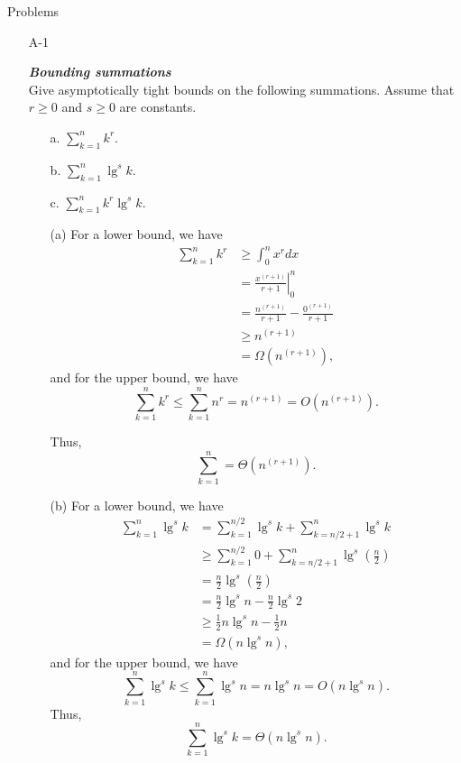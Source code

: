\documentclass{report}
\makeatletter
\renewenvironment{framed}{%
 \def\FrameCommand##1{\hskip\@totalleftmargin
 \fboxsep=\FrameSep\fbox{##1}}%
 \MakeFramed {\advance\hsize-\width
   \@totalleftmargin\z@ \linewidth\hsize
   \@setminipage}}%
 {\par\unskip\endMakeFramed}
\newcommand*\Eval[3]{\left.#1\right\rvert_{#2}^{#3}}
\makeatother
\begin{document}
\newpage

{\large Problems}

\begin{enumerate}

\item[A{-}1]{\textbf{\emph{Bounding summations}}\\
Give asymptotically tight bounds on the following summations. Assume that
$r \ge 0$ and $s \ge 0$ are constants.
\begin{enumerate}
  \item[a.] $\sum_{k = 1}^{n} k^r$.
  \item[b.] $\sum_{k = 1}^{n} \lg^s k$.
  \item[c.] $\sum_{k = 1}^{n} k^r \lg^s k$.
\end{enumerate}
}

\begin{framed}
\begin{enumerate}
\item[(a)] For a lower bound, we have
\begin{equation*}
\begin{aligned}
  \sum_{k = 1}^{n} k^r &\ge \int_{0}^{n} x^r dx\\
                       &=   \Eval{\frac{x^{(r + 1)}}{r + 1}}{0}{n}\\
                       &=   \frac{n^{(r + 1)}}{r + 1} - \frac{0^{(r + 1)}}{r + 1}\\
                       &\ge n^{(r + 1)}\\
                       &=   \Omega(n^{(r + 1)}),
\end{aligned}
\end{equation*}
and for the upper bound, we have
\[
  \sum_{k = 1}^{n} k^r \le \sum_{k = 1}^{n} n^r = n^{(r + 1)} = O(n^{(r + 1)}).
\]

Thus,
\[
  \sum_{k = 1}^{n} = \Theta(n^{(r + 1)}).
\]

\item[(b)] For a lower bound, we have
\begin{equation*}
\begin{aligned}
  \sum_{k = 1}^{n} \lg^{s} k &=   \sum_{k = 1}^{n/2} \lg^{s} k + \sum_{k = n/2 + 1}^{n} \lg^{s} k\\
                             &\ge \sum_{k = 1}^{n/2} 0 + \sum_{k = n/2 + 1}^{n} \lg^{s}{\left(\frac{n}{2}\right)}\\
                             &=   \frac{n}{2} \lg^{s}{\left(\frac{n}{2}\right)}\\
                             &=   \frac{n}{2} \lg^{s}{n} - \frac{n}{2} \lg^{s}{2}\\
                             &\ge \frac{1}{2} n \lg^{s} n - \frac{1}{2} n\\
                             &=   \Omega(n \lg^s n),
\end{aligned}
\end{equation*}
and for the upper bound, we have
\[
  \sum_{k = 1}^{n} \lg^{s} k \le \sum_{k = 1}^{n} \lg^{s} n = n \lg^s n = O(n \lg^s n).
\]
Thus,
\[
  \sum_{k = 1}^{n} \lg^{s} k = \Theta(n \lg^s n).
\]


\end{enumerate}
\end{framed}
\end{enumerate}
\end{document}
